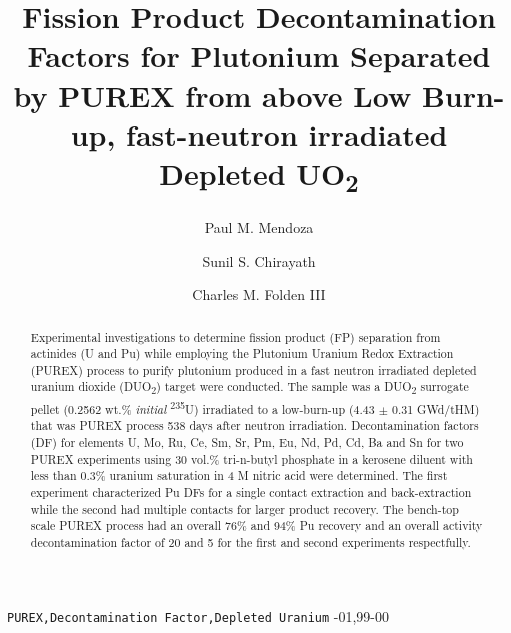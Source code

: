 \documentclass[review]{elsarticle}
\newcommand{\tss}{\textsuperscript}
\newcommand{\tsbs}{\textsubscript}
\begin{document}
\begin{frontmatter}

\title{Fission Product Decontamination Factors for Plutonium Separated by PUREX from above
	   Low Burn-up, fast-neutron irradiated Depleted UO\tsbs{2}}

\author[NSSPI,NUEN]{Paul M. Mendoza}

\author[NSSPI,NUEN]{Sunil S. Chirayath}

\author[CYC]{Charles M. Folden III}

\address{Texas A\&M University, College Station, TX 77843-3473}

\address[NSSPI]{Nuclear Security Science \& Policy Institute (NSSPI)}
\address[NUEN]{TAMU Department of Nuclear Engineering}
\address[CYC]{Cyclotron Institute}

\begin{abstract}
\begin{singlespace}
Experimental investigations to determine fission product (FP) separation from actinides
(U and Pu) while employing the Plutonium Uranium Redox Extraction (PUREX)
 process to purify plutonium produced in a fast neutron irradiated depleted uranium dioxide (DUO\tsbs{2})
 target were conducted.
 The sample was a DUO\tsbs{2} surrogate pellet (0.2562 wt.\% \emph{initial} \tss{235}U)
 irradiated to a low-burn-up (4.43 $\pm$ 0.31 GWd/tHM) that was PUREX process 538
 days after neutron irradiation. 
 Decontamination factors (DF) for elements
 U, Mo, Ru, Ce, Sm, Sr, Pm, Eu, Nd, Pd, Cd, Ba and Sn
 for two PUREX experiments using 30 vol.\% tri-n-butyl phosphate in a kerosene diluent
 with less than 0.3\% uranium saturation in 4 M nitric acid were determined. The first experiment
 characterized Pu DFs for a single contact extraction and back-extraction while the 
 second had multiple contacts for larger product recovery. The bench-top scale
 PUREX process had an overall 76\% and 94\% Pu recovery and an overall activity decontamination
 factor of \color{red}20 \color{black} and \color{red}5 \color{black} for the first 
 and second experiments respectfully.
\end{singlespace}
\end{abstract}

\begin{keyword}
\texttt{PUREX\sep Decontamination Factor\sep Depleted Uranium} 
-01\sep  99-00
\end{keyword}

\end{frontmatter}
\end{document}
